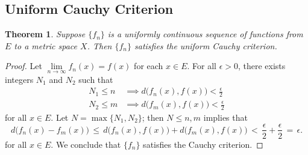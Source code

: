 \documentclass[11pt]{article}
\newtheorem{theorem}{Theorem}
\begin{document}
\newpage


\subsection{Uniform Cauchy Criterion}

\begin{theorem}
	Suppose $\{ f_{n} \}$ is a uniformly continuous sequence of functions from $E$ to a metric space $X$. Then $\{ f_{n} \}$ satisfies the uniform Cauchy criterion.
\end{theorem}
\begin{adjustwidth}{1cm}{}
	\begin{proof}
		Let $\lim\limits_{n \to \infty} f_{n}(x) = f(x)$ for each $x \in E$. For all $\epsilon > 0$, there exists integers $N_{1}$ and $N_{2}$ such that
		\begin{align*}
			N_{1} \le n &\implies d \big( f_{n}(x), f(x) \big) < \frac{\epsilon}{2} \\
			N_{2} \le m &\implies d \big( f_{m}(x), f(x) \big) < \frac{\epsilon}{2}
		\end{align*}
		for all $x \in E$. Let $N = \max \{ N_{1}, N_{2} \}$; then $N \le n, m$ implies that
		\[
			d \big( f_{n}(x) - f_{m}(x) \big) \, \le \, d \big( f_{n}(x), f(x) \big) + d \big( f_{m}(x), f(x) \big) \, < \, \frac{\epsilon}{2} + \frac{\epsilon}{2} \, = \, \epsilon.
		\]
		for all $x \in E$. We conclude that $\{ f_{n} \}$ satisfies the Cauchy criterion.
	\end{proof}
\end{adjustwidth}
\end{document}
